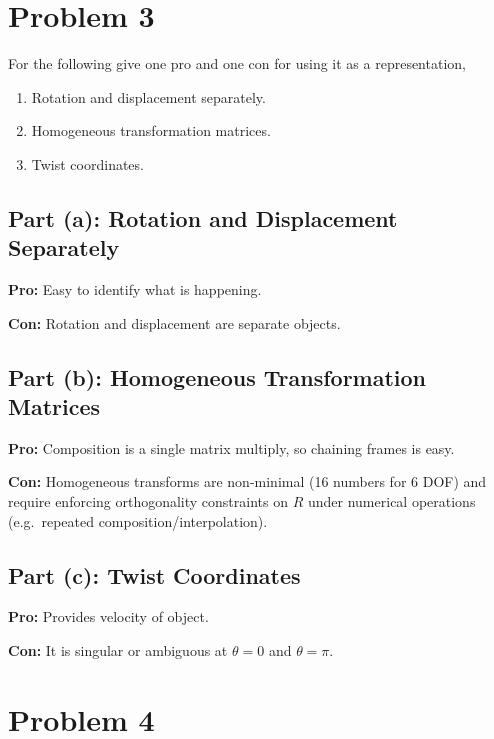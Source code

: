 \documentclass[11pt]{article}
\begin{document}
\section*{Problem 3}

\begin{statement}
For the following give one pro and one con for using it as a representation,
\begin{enumerate}[label=(\alph*), leftmargin=1.6em, itemsep=2pt]
    \item Rotation and displacement separately.
    \item Homogeneous transformation matrices.
    \item Twist coordinates.
\end{enumerate}
\end{statement}

\subsection*{Part (a): Rotation and Displacement Separately}
\textbf{Pro:} Easy to identify what is happening.

\textbf{Con:} Rotation and displacement are separate objects.

\subsection*{Part (b): Homogeneous Transformation Matrices}
\textbf{Pro:} Composition is a single matrix multiply, so chaining frames is easy.

\textbf{Con:} Homogeneous transforms are non-minimal (16 numbers for 6 DOF) and require enforcing orthogonality constraints on $R$ under numerical operations (e.g.\ repeated composition/interpolation).

\subsection*{Part (c): Twist Coordinates}
\textbf{Pro:} Provides velocity of object.

\textbf{Con:} It is singular or ambiguous at $\theta = 0$ and $\theta = \pi$.

\newpage
\section*{Problem 4}
\end{document}
